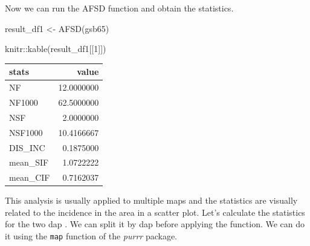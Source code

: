 \documentclass[
  letterpaper,
]{book}
\newenvironment{Shaded}{\begin{snugshade}}{\end{snugshade}}
\newcommand{\DecValTok}[1]{\textcolor[rgb]{0.68,0.00,0.00}{#1}}
\newcommand{\FunctionTok}[1]{\textcolor[rgb]{0.28,0.35,0.67}{#1}}
\newcommand{\NormalTok}[1]{\textcolor[rgb]{0.00,0.23,0.31}{#1}}
\newcommand{\OtherTok}[1]{\textcolor[rgb]{0.00,0.23,0.31}{#1}}
\newcommand{\SpecialCharTok}[1]{\textcolor[rgb]{0.37,0.37,0.37}{#1}}
\begin{document}
Now we can run the AFSD function and obtain the statistics.

\begin{Shaded}
\begin{Highlighting}[]
\NormalTok{result\_df1 }\OtherTok{\textless{}{-}} \FunctionTok{AFSD}\NormalTok{(gsb65)}

\NormalTok{knitr}\SpecialCharTok{::}\FunctionTok{kable}\NormalTok{(result\_df1[[}\DecValTok{1}\NormalTok{]])}
\end{Highlighting}
\end{Shaded}

\begin{longtable}[]{@{}lr@{}}
\toprule\noalign{}
stats & value \\
\midrule\noalign{}
\endhead
\bottomrule\noalign{}
\endlastfoot
NF & 12.0000000 \\
NF1000 & 62.5000000 \\
NSF & 2.0000000 \\
NSF1000 & 10.4166667 \\
DIS\_INC & 0.1875000 \\
mean\_SIF & 1.0722222 \\
mean\_CIF & 0.7162037 \\
\end{longtable}

This analysis is usually applied to multiple maps and the statistics are
visually related to the incidence in the area in a scatter plot. Let's
calculate the statistics for the two dap . We can split it by dap before
applying the function. We can do it using the \texttt{map} function of
the \emph{purrr} package.
\end{document}
